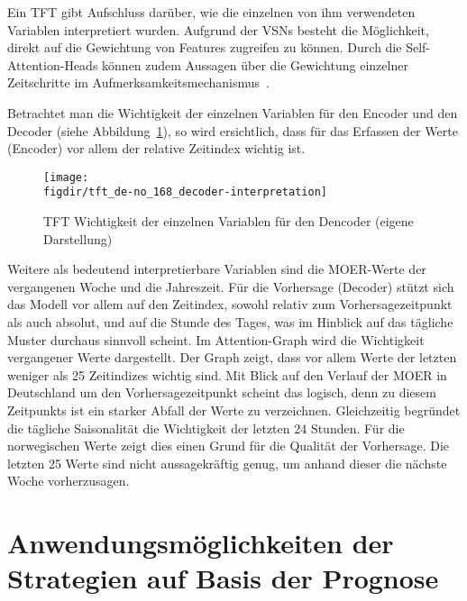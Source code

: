 Ein \ac{TFT} gibt Aufschluss darüber, wie die einzelnen von ihm verwendeten Variablen interpretiert wurden.
Aufgrund der \acp{VSN} besteht die Möglichkeit, direkt auf die Gewichtung von Features zugreifen zu können.
Durch die Self-Attention-Heads können zudem Aussagen über die Gewichtung einzelner Zeitschritte im Aufmerksamkeitsmechanismus~\cite{Joseph.2022}.

Betrachtet man die Wichtigkeit der einzelnen Variablen für den Encoder und den Decoder (siehe Abbildung~\ref{FIG:decoder-interpretation}), so wird ersichtlich, dass für das Erfassen der Werte (Encoder) vor allem der relative Zeitindex wichtig ist.
\begin{figure}
 \caption[TFT Vorhersage Einluss einzelner Variablen]{TFT Wichtigkeit der einzelnen Variablen für den Dencoder (eigene Darstellung)}
 {\texttt{[image: \\figdir/tft\_de-no\_168\_decoder-interpretation]}}
 \label{FIG:decoder-interpretation}
\end{figure}
Weitere als bedeutend interpretierbare Variablen sind die \ac{MOER}-Werte der vergangenen Woche und die Jahreszeit.
Für die Vorhersage (Decoder) stützt sich das Modell vor allem auf den Zeitindex, sowohl relativ zum Vorhersagezeitpunkt als auch absolut, und auf die Stunde des Tages, was im Hinblick auf das tägliche Muster durchaus sinnvoll scheint.
Im Attention-Graph wird die Wichtigkeit vergangener Werte dargestellt.
Der Graph zeigt, dass vor allem Werte der letzten weniger als 25 Zeitindizes wichtig sind.
Mit Blick auf den Verlauf der \ac{MOER} in Deutschland um den Vorhersagezeitpunkt scheint das logisch, denn zu diesem Zeitpunkts ist ein starker Abfall der Werte zu verzeichnen.
Gleichzeitig begründet die tägliche Saisonalität die Wichtigkeit der letzten 24 Stunden.
Für die norwegischen Werte zeigt dies einen Grund für die Qualität der Vorhersage.
Die letzten 25 Werte sind nicht aussagekräftig genug, um anhand dieser die nächste Woche vorherzusagen.
\chapter{Anwendungsmöglichkeiten der Strategien auf Basis der Prognose}\label{CAP:prediction-application}
